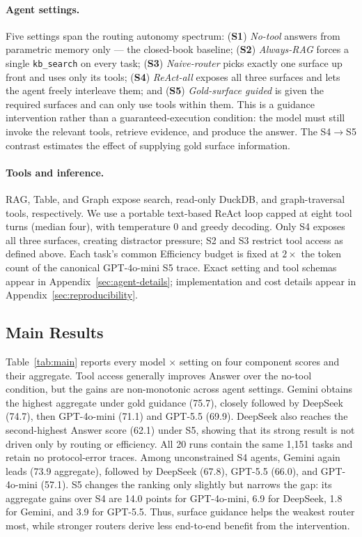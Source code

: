 \documentclass[11pt]{article}
\begin{document}
\paragraph{Agent settings.}
Five settings span the routing autonomy spectrum:
(\textbf{S1}) \emph{No-tool} answers from parametric memory only ---
the closed-book baseline;
(\textbf{S2}) \emph{Always-RAG} forces a single \texttt{kb\_search} on every
task;
(\textbf{S3}) \emph{Naive-router} picks exactly one surface up front and
uses only its tools;
(\textbf{S4}) \emph{ReAct-all} exposes all three surfaces and lets the agent
freely interleave them; and
(\textbf{S5}) \emph{Gold-surface guided} is given the required surfaces and
can only use tools within them. This is a guidance intervention rather than a
guaranteed-execution condition: the model must still invoke the relevant
tools, retrieve evidence, and produce the answer. The S4$\to$S5 contrast
estimates the effect of supplying gold surface information.

\paragraph{Tools and inference.}
RAG, Table, and Graph expose search, read-only DuckDB, and graph-traversal
tools, respectively. We use a portable text-based ReAct loop capped at eight
tool turns (median four), with temperature 0 and greedy decoding. Only S4
exposes all three surfaces, creating distractor pressure; S2 and S3 restrict
tool access as defined above. Each task's common Efficiency budget is fixed at
$2\times$ the token count of the canonical GPT-4o-mini S5 trace. Exact setting and tool schemas appear in
Appendix~\ref{sec:agent-details}; implementation and cost details appear in
Appendix~\ref{sec:reproducibility}.

\subsection{Main Results}
\label{sec:mainresults}

Table~\ref{tab:main} reports every model $\times$ setting on four component
scores and their aggregate. Tool access generally improves Answer over the
no-tool condition, but the gains are non-monotonic across agent settings.
Gemini obtains the highest aggregate under gold guidance (75.7), closely
followed by DeepSeek (74.7), then GPT-4o-mini (71.1) and GPT-5.5 (69.9).
DeepSeek also reaches the second-highest Answer score (62.1) under S5, showing
that its strong result is not driven only by routing or efficiency. All 20
runs contain the same 1{,}151 tasks and retain no protocol-error traces.
Among unconstrained S4 agents, Gemini again leads (73.9 aggregate), followed by
DeepSeek (67.8), GPT-5.5 (66.0), and GPT-4o-mini (57.1). S5 changes the ranking
only slightly but narrows the gap: its aggregate gains over S4 are 14.0 points
for GPT-4o-mini, 6.9 for DeepSeek, 1.8 for Gemini, and 3.9 for GPT-5.5. Thus,
surface guidance helps the weakest router most, while stronger routers derive
less end-to-end benefit from the intervention.
\end{document}
